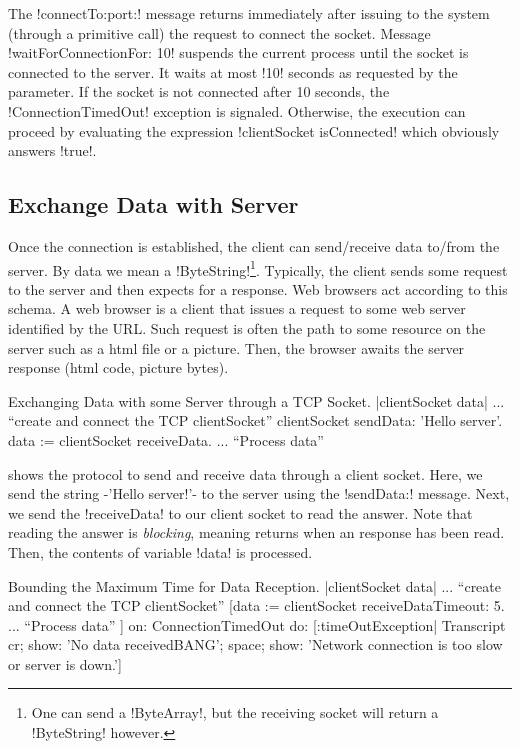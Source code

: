 \documentclass[a4paper,10pt,twoside]{book}
\begin{document}
The \ct!connectTo:port:!  message returns immediately after issuing to the system (through a primitive call) the request to connect the socket.
Message \ct!waitForConnectionFor: 10! suspends the current process until the socket is connected to the server.
It waits at most \ct!10! seconds as requested by the parameter.
If the socket is not connected after 10 seconds, the \ct!ConnectionTimedOut! exception is signaled. 
Otherwise, the execution can proceed by evaluating the expression \ct!clientSocket isConnected! which obviously answers \ct!true!.



\subsection{Exchange Data with Server}
\label{sec:exchangeData}
Once the connection is established, the client can send/receive data to/from the server.
By data we mean a \ct!ByteString!\footnote{One can send a \ct!ByteArray!, but the receiving socket will return a \ct!ByteString! however. }.
Typically, the client sends some request to the server and then expects for a response.
Web browsers act according to this schema.
A web browser is a client that issues a request to some web server identified by the URL.
Such request is often the path to some resource on the server such as a html file or a picture.
Then, the browser awaits the server response (\eg html code, picture bytes).

\begin{script}[dataExhangeWithTcpSocket]{Exchanging Data with some Server through a TCP Socket.}
|clientSocket data|
... ``create and connect the TCP clientSocket''
clientSocket sendData: 'Hello server'.
data := clientSocket receiveData.
... ``Process data''
\end{script}

\sd{}

 shows the protocol to send and receive data through a client socket.
Here, we send the string \ct-'Hello server!'- to the server using the \ct!sendData:! message.
Next, we send the \ct!receiveData! to our client socket to read the answer. Note that reading the answer is \emph{blocking}, meaning  returns when an response has been read. Then, the contents of variable \ct!data! is processed.

\begin{script}[dataReceptionTimeOut]{Bounding the Maximum Time for Data Reception.}
|clientSocket data|
... ``create and connect the TCP clientSocket''
[data := clientSocket receiveDataTimeout: 5.
... ``Process data''
] on: ConnectionTimedOut 
do: [:timeOutException|
	Transcript 
		cr; 
		show: 'No data receivedBANG';
		space;
		show: 'Network connection is too slow or server is down.']
\end{script}
\end{document}
